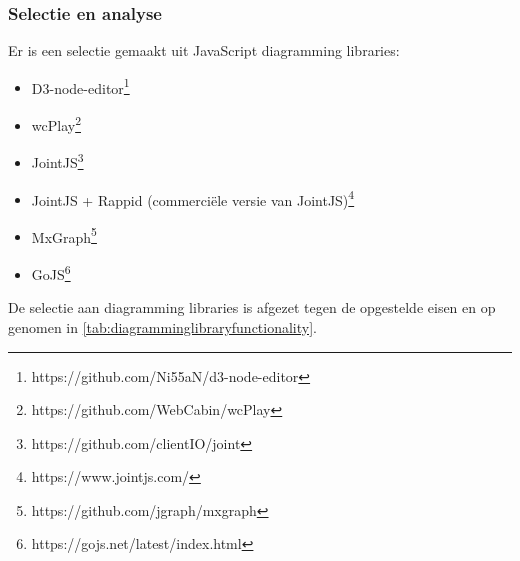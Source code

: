 \subsubsection{Selectie en analyse}
Er is een selectie gemaakt uit JavaScript diagramming libraries:
\begin{itemize}
    \item D3-node-editor\footnote{https://github.com/Ni55aN/d3-node-editor}
    \item wcPlay\footnote{https://github.com/WebCabin/wcPlay}
    \item JointJS\footnote{ https://github.com/clientIO/joint}
    \item JointJS + Rappid (commerciële versie van JointJS)\footnote{https://www.jointjs.com/}
    \item MxGraph\footnote{https://github.com/jgraph/mxgraph}
    \item GoJS\footnote{https://gojs.net/latest/index.html}
\end{itemize}

\noindent De selectie aan diagramming libraries is afgezet tegen de opgestelde eisen en op genomen in \autoref{tab:diagramminglibraryfunctionality}.


